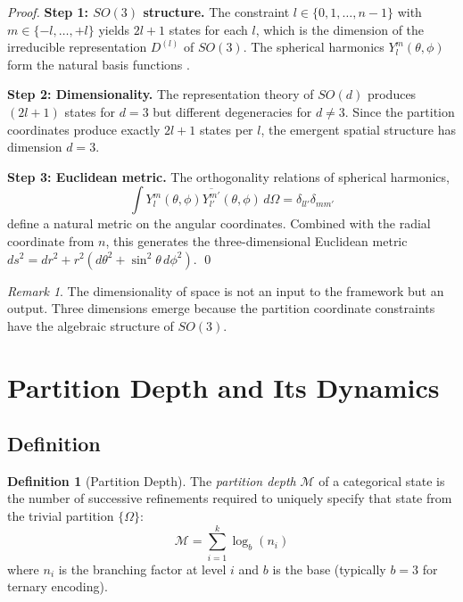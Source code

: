 \documentclass[twocolumn,10pt,a4paper]{article}
\theoremstyle{definition}
\newtheorem{definition}[theorem]{Definition}
\theoremstyle{remark}
\newtheorem{remark}[theorem]{Remark}
\newcommand{\Depth}{\mathcal{M}}
\begin{document}
\begin{proof}
\textbf{Step 1: $SO(3)$ structure.}
The constraint $l \in \{0, 1, \ldots, n-1\}$ with $m \in \{-l, \ldots, +l\}$ yields $2l+1$ states for each $l$, which is the dimension of the irreducible representation $D^{(l)}$ of $SO(3)$. The spherical harmonics $Y_l^m(\theta, \phi)$ form the natural basis functions \citep{griffiths2018}.

\textbf{Step 2: Dimensionality.}
The representation theory of $SO(d)$ produces $(2l+1)$ states for $d = 3$ but different degeneracies for $d \neq 3$. Since the partition coordinates produce exactly $2l+1$ states per $l$, the emergent spatial structure has dimension $d = 3$.

\textbf{Step 3: Euclidean metric.}
The orthogonality relations of spherical harmonics,
\begin{equation}
    \int Y_l^m(\theta, \phi) \overline{Y_{l'}^{m'}}(\theta, \phi) \, d\Omega = \delta_{ll'}\delta_{mm'}
\end{equation}
define a natural metric on the angular coordinates. Combined with the radial coordinate from $n$, this generates the three-dimensional Euclidean metric $ds^2 = dr^2 + r^2(d\theta^2 + \sin^2\theta \, d\phi^2)$. \qed
\end{proof}

\begin{remark}
The dimensionality of space is not an input to the framework but an output. Three dimensions emerge because the partition coordinate constraints have the algebraic structure of $SO(3)$.
\end{remark}

\section{Partition Depth and Its Dynamics}
\label{sec:depth}

\subsection{Definition}

\begin{definition}[Partition Depth]
\label{def:depth}
The \emph{partition depth} $\Depth$ of a categorical state is the number of successive refinements required to uniquely specify that state from the trivial partition $\{\Omega\}$:
\begin{equation}
    \Depth = \sum_{i=1}^{k} \log_b(n_i)
\end{equation}
where $n_i$ is the branching factor at level $i$ and $b$ is the base (typically $b = 3$ for ternary encoding).
\end{definition}
\end{document}

